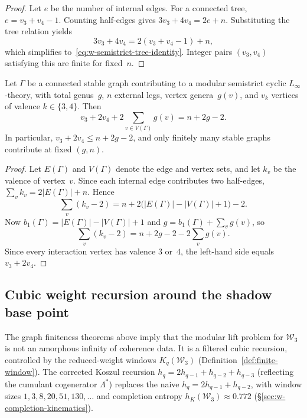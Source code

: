 \begin{proof}
Let $e$ be the number of internal edges.  For a connected tree,
$e = v_3 + v_4 - 1$.  Counting half-edges gives
$3v_3 + 4v_4 = 2e + n$.  Substituting the tree relation yields
\[
3v_3 + 4v_4 = 2(v_3 + v_4 - 1) + n,
\]
which simplifies to~\eqref{eq:w-semistrict-tree-identity}.  Integer
pairs $(v_3, v_4)$ satisfying this are finite for fixed~$n$.
\end{proof}

\begin{proposition}
\label{prop:w-semistrict-stable-graph}
Let $\Gamma$ be a connected stable graph contributing to a modular
semistrict cyclic $L_\infty$-theory, with total genus~$g$, $n$
external legs, vertex genera~$g(v)$, and $v_k$ vertices of valence
$k \in \{3,4\}$.  Then
\begin{equation}
\label{eq:w-semistrict-stable-graph}
v_3 + 2v_4 + 2\sum_{v \in V(\Gamma)} g(v) = n + 2g - 2.
\end{equation}
In particular, $v_3 + 2v_4 \le n + 2g - 2$, and only finitely many
stable graphs contribute at fixed $(g,n)$.
\end{proposition}

\begin{proof}
Let $E(\Gamma)$ and $V(\Gamma)$ denote the edge and vertex sets, and
let $k_v$ be the valence of vertex~$v$.  Since each internal edge
contributes two half-edges,
$\sum_v k_v = 2|E(\Gamma)| + n$.  Hence
\[
\sum_v (k_v - 2) = n + 2\bigl(|E(\Gamma)| - |V(\Gamma)| + 1\bigr)
- 2.
\]
Now $b_1(\Gamma) = |E(\Gamma)| - |V(\Gamma)| + 1$ and
$g = b_1(\Gamma) + \sum_v g(v)$, so
\[
\sum_v (k_v - 2) = n + 2g - 2 - 2\sum_v g(v).
\]
Since every interaction vertex has valence $3$ or~$4$, the left-hand
side equals $v_3 + 2v_4$.
\end{proof}

\subsection{Cubic weight recursion around the shadow base point}
\label{subsec:semistrict-cubic-recursion}

The graph finiteness theorems above imply that the modular lift
problem for $\mathcal{W}_3$ is not an amorphous infinity of coherence
data.  It is a filtered cubic recursion, controlled by the
reduced-weight windows $K_q(\mathcal{W}_3)$
(Definition~\ref{def:finite-window}).  The corrected Koszul recursion
$h_q = 2h_{q-1} + h_{q-2} + h_{q-3}$ (reflecting the cumulant
cogenerator $\Lambda^*$) replaces the naive
$h_q = 2h_{q-1} + h_{q-2}$, with window sizes
$1, 3, 8, 20, 51, 130, \ldots$ and completion entropy
$h_K(\mathcal{W}_3) \approx 0.772$
(\S\ref{sec:w-completion-kinematics}).

